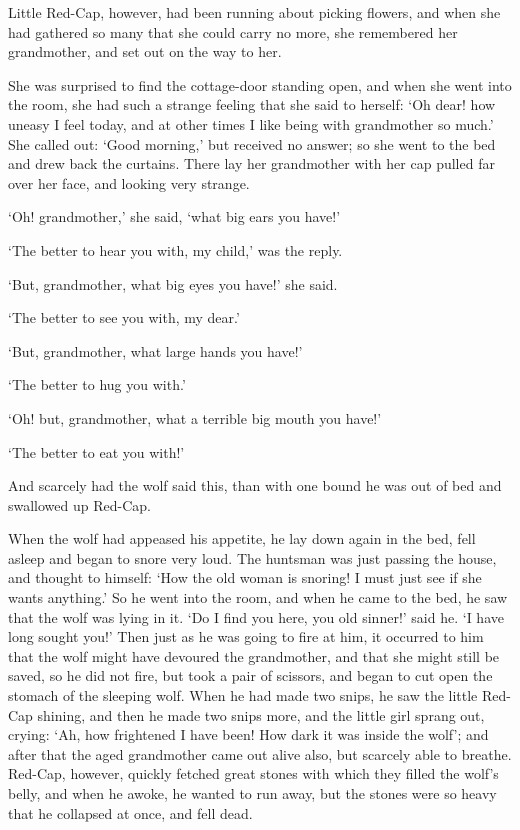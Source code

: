 \documentclass[oneside,11pt]{memoir} %
\begin{document}
Little Red-Cap, however, had been running about picking flowers, and when she had gathered so many that she could carry no more, she remembered her grandmother, and set out on the way to her.

She was surprised to find the cottage-door standing open, and when she went into the room, she had such a strange feeling that she said to herself: `Oh dear! how uneasy I feel today, and at other times I like being with grandmother so much.' She called out: `Good morning,' but received no answer; so she went to the bed and drew back the curtains. There lay her grandmother with her cap pulled far over her face, and looking very strange.

`Oh! grandmother,' she said, `what big ears you have!'

`The better to hear you with, my child,' was the reply.

`But, grandmother, what big eyes you have!' she said.

`The better to see you with, my dear.'

`But, grandmother, what large hands you have!'

`The better to hug you with.'

`Oh! but, grandmother, what a terrible big mouth you have!'

`The better to eat you with!'

And scarcely had the wolf said this, than with one bound he was out of bed and swallowed up Red-Cap.

When the wolf had appeased his appetite, he lay down again in the bed, fell asleep and began to snore very loud. The huntsman was just passing the house, and thought to himself: `How the old woman is snoring! I must just see if she wants anything.' So he went into the room, and when he
came to the bed, he saw that the wolf was lying in it. `Do I find you here, you old sinner!' said he. `I have long sought you!' Then just as he was going to fire at him, it occurred to him that the wolf might have devoured the grandmother, and that she might still be saved, so he did not fire, but took a pair of scissors, and began to cut open the stomach of the sleeping wolf. When he had made two snips, he saw the little Red-Cap shining, and then he made two snips more, and the little girl sprang out, crying: `Ah, how frightened I have been! How dark it was inside the wolf'; and after that the aged grandmother came out alive also, but scarcely able to breathe. Red-Cap, however, quickly fetched
great stones with which they filled the wolf's belly, and when he awoke, he wanted to run away, but the stones were so heavy that he collapsed at once, and fell dead.
\end{document}
